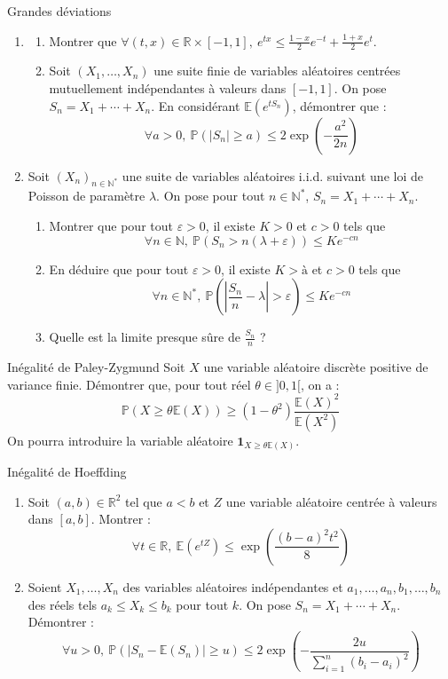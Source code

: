 \documentclass[french,a4paper]{article}
\renewcommand{\P}{\mathbb{P}}
\newcommand{\N}{\mathbb{N}}
\newcommand{\R}{\mathbb{R}}
\newcommand{\st}{^*}
\newcommand{\E}{\mathbb{E}}
\theoremstyle{plain}
\theoremstyle{definition}
\theoremstyle{remark}
\begin{document}
\begin{ex}[Châteaux]{Grandes déviations}
	\begin{enumerate}
		\item \begin{enumerate}[label=\alph*.]
			\item Montrer que $\forall(t,x)\in\R\times[-1,1],\ e^{tx}\leqslant\displaystyle\frac{1-x}{2}e^{-t}+\frac{1+x}{2}e^{t}$.
			\item Soit $(X_1,\ldots,X_n)$ une suite finie de variables aléatoires centrées mutuellement indépendantes à valeurs dans $[-1,1]$. On pose $S_n=X_1+\cdots+X_n$. En considérant $\E(e^{tS_n})$, démontrer que : $$\forall a>0,\ \P(\lvert S_n\rvert\geqslant a)\leqslant 2\exp\left(-\frac{a^2}{2n}\right)$$
		\end{enumerate}
		\item Soit $(X_n)_{n\in\N\st}$ une suite de variables aléatoires i.i.d. suivant une loi de Poisson de paramètre $\lambda$. On pose pour tout $n\in\N\st$, $S_n=X_1+\cdots+X_n$.
		\begin{enumerate}[label=\alph*.]
			\item Montrer que pour tout $\varepsilon>0$, il existe $K>0$ et $c>0$ tels que $$\forall n\in\N,\ \P(S_n>n(\lambda+\varepsilon))\leqslant Ke^{-cn}$$
			\item En déduire que pour tout $\varepsilon>0$, il existe $K>à$ et $c>0$ tels que $$\forall n\in\N\st,\ \P\left(\left\lvert \frac{S_n}{n}-\lambda\right\rvert>\varepsilon\right)\leqslant Ke^{-cn}$$
			\item Quelle est la limite presque sûre de $\displaystyle\frac{S_n}{n}$ ?
		\end{enumerate}
	\end{enumerate}
\end{ex}
\begin{ex}[Châteaux]{Inégalité de Paley-Zygmund}
	Soit $X$ une variable aléatoire discrète positive de variance finie. Démontrer que, pour tout réel $\theta\in]0,1[$, on a : $$\P(X\geqslant\theta\E(X))\geqslant(1-\theta^2)\frac{\E(X)^2}{\E(X^2)}$$ On pourra introduire la variable aléatoire $\mathbf{1}_{X\geqslant\theta\E(X)}$. 
\end{ex}
\begin{ex}[Châteaux]{Inégalité de Hoeffding}
	\begin{enumerate}
		\item Soit $(a,b)\in\R^2$ tel que $a<b$ et $Z$ une variable aléatoire centrée à valeurs dans $[a,b]$. Montrer : $$\forall t\in\R,\ \E(e^{tZ})\leqslant\exp\left(\frac{(b-a)^2t^2}{8}\right)$$
		\item Soient $X_1,\ldots,X_n$ des variables aléatoires indépendantes et $a_1,\ldots,a_n,b_1,\ldots,b_n$ des réels tels $a_k\leqslant X_k\leqslant b_k$ pour tout $k$. On pose $S_n=X_1+\cdots+X_n$. Démontrer : $$\forall u>0,\ \P(\lvert S_n-\E(S_n)\rvert\geqslant u)\leqslant 2\exp\left(-\frac{2u}{\sum_{i=1}^{n}(b_i-a_i)^2}\right)$$
	\end{enumerate}
\end{ex}
\end{document}
